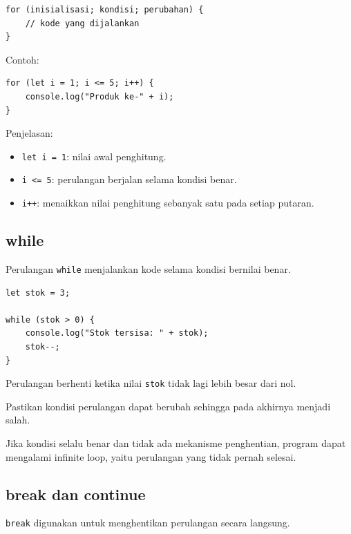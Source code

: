 \documentclass[12pt,a4paper]{article}
\begin{document}
\begin{lstlisting}
for (inisialisasi; kondisi; perubahan) {
    // kode yang dijalankan
}
\end{lstlisting}

Contoh:

\begin{lstlisting}
for (let i = 1; i <= 5; i++) {
    console.log("Produk ke-" + i);
}
\end{lstlisting}

Penjelasan:

\begin{itemize}
    \item \texttt{let i = 1}: nilai awal penghitung.
    \item \texttt{i <= 5}: perulangan berjalan selama
    kondisi benar.
    \item \texttt{i++}: menaikkan nilai penghitung
    sebanyak satu pada setiap putaran.
\end{itemize}

\subsection{while}

Perulangan \texttt{while} menjalankan kode selama
kondisi bernilai benar.

\begin{lstlisting}
let stok = 3;

while (stok > 0) {
    console.log("Stok tersisa: " + stok);
    stok--;
}
\end{lstlisting}

Perulangan berhenti ketika nilai \texttt{stok}
tidak lagi lebih besar dari nol.

\begin{tcolorbox}[
    colback=warningyellow,
    colframe=orange!70!black,
    title=\textbf{Perhatian: Infinite Loop}
]
Pastikan kondisi perulangan dapat berubah sehingga
pada akhirnya menjadi salah.

Jika kondisi selalu benar dan tidak ada mekanisme
penghentian, program dapat mengalami infinite loop,
yaitu perulangan yang tidak pernah selesai.
\end{tcolorbox}

\subsection{break dan continue}

\texttt{break} digunakan untuk menghentikan
perulangan secara langsung.
\end{document}
